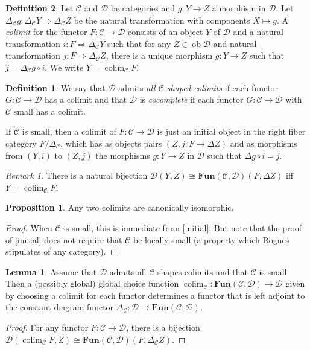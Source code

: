 \documentclass[10pt,letterpaper,cm]{nupset}
\theoremstyle{definition}
\newtheorem{definition}{Definition}
\theoremstyle{theorem}
\newtheorem{lemma}[theorem]{Lemma}
\newtheorem{prop}[theorem]{Proposition}
\theoremstyle{remark}
\newtheorem{remark}{Remark}
\newcommand{\1}{\mathbf{1}}
\renewcommand{\c}{\mathscr{C}}
\renewcommand{\d}{\mathscr{D}}
\newcommand{\0}{\vec 0}
\DeclareMathOperator{\ob}{ob}
\DeclareMathOperator{\colim}{colim}
\begin{document}
\begin{definition}
Let $\c$ and $\d$ be categories and $g: Y \to Z$ a morphism in $\d$. Let $\Delta_{\c} g : \Delta_{\c} Y \Rightarrow \Delta_{\c} Z$ be the natural transformation with components $X \mapsto g$. A \textit{colimit} for the functor $F: \c \to \d$ consists of an object $Y$ of $\d$ and a natural transformation $i : F \Rightarrow \Delta_{\c} Y$ such that for any $Z \in \ob \d$ and natural transformation $j: F \Rightarrow \Delta_{\c} Z$, there is a unique morphism $g: Y \to Z$ such that $j = \Delta_{\c}g \circ i$. We write $Y = \colim_{\c} F$.
\begin{definition} We say that $\d$ admits \textit{all $\c$-shaped colimits} if each functor $G: \c \to \d$ has a colimit and that $\d$ is \textit{cocomplete} if each functor $G : \c \to \d$ with $\c$ small has a colimit.
\end{definition}
\end{definition}

If $\c$ is small, then a colimit of $F: \c \to \d$ is just an initial object in the right fiber category $F/\Delta_{\c}$, which has as objects pairs $(Z, j: F \to \Delta Z)$ and as morphisms from $(Y, i)$ to $(Z, j)$ the morphisms $g : Y \to Z$ in $\d$ such that $\Delta g \circ i = j$.

\begin{remark}
There is a natural bijection $\d(Y, Z) \cong \mathbf{Fun}(\c, \d)(F, \Delta Z)$ iff $Y = \colim_{\c}F$.
\end{remark}

\begin{prop}
Any two colimits are canonically isomorphic.
\end{prop}
\begin{proof}
When $\c$ is small, this is immediate from \cref{initial}. But note that the proof of \cref{initial} does not require that $\c$ be locally small (a property which Rognes stipulates of any category). 
\end{proof}

\begin{lemma}
Assume that $\d$ admits all $\c$-shapes colimits and that $\c$ is small. Then a (possibly global) global choice function $\colim_\c : \mathbf{Fun}(\c, \d) \to \d$ given by choosing a colimit for each functor determines a functor that is left adjoint to the constant diagram functor $\Delta_{\c} : \d \to \mathbf{Fun}(\c, \d)$.
\end{lemma}
\begin{proof}
For any functor $F : \c \to \d$, there is a bijection $\d(\colim_{\c} F, Z) \cong \mathbf{Fun}(\c, \d)(F, \Delta_{\c}Z)$.
\end{proof}
\end{document}
